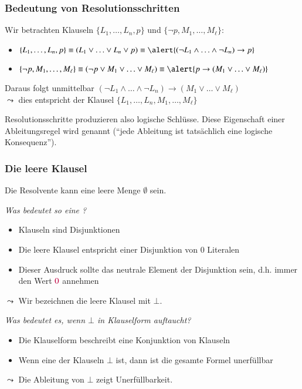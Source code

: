 \documentclass[onlymath]{beamer}
\begin{document}
\begin{frame}\frametitle{Bedeutung von Resolutionsschritten}

Wir betrachten Klauseln $\{L_1,\ldots,L_n,p\}$ und $\{\neg p,M_1,\ldots,M_\ell\}$:\pause
\begin{itemize}
\item $\{L_1,\ldots,L_n,p\}\equiv (L_1\vee\ldots\vee L_n\vee p) \equiv \alert{(\neg L_1\wedge\ldots\wedge\neg L_n)\to p}$\pause
\item $\{\neg p,M_1,\ldots,M_\ell\}\equiv (\neg p\vee M_1\vee\ldots\vee M_\ell)\equiv \alert{p\to (M_1\vee\ldots\vee M_\ell)}$\pause
\end{itemize}\medskip

Daraus folgt unmittelbar \alert{$(\neg L_1\wedge\ldots\wedge\neg L_n)\to (M_1\vee\ldots\vee M_\ell)$}\\
$\leadsto$ dies entspricht der Klausel $\{L_1,\ldots,L_n,M_1,\ldots,M_\ell\}$\pause
\bigskip


Resolutionsschritte produzieren also logische Schlüsse. Diese Eigenschaft einer Ableitungsregel wird  genannt ("`jede Ableitung ist tatsächlich eine logische Konsequenz"').


\end{frame}

\begin{frame}\frametitle{Die leere Klausel}

Die Resolvente kann eine leere Menge $\emptyset$ sein.\\[1ex]

\medskip

\emph{Was bedeutet so eine ?}\pause
\begin{itemize}
\item Klauseln sind Disjunktionen
\item Die leere Klausel entspricht einer Disjunktion von $0$ Literalen
\item Dieser Ausdruck sollte das neutrale Element der Disjunktion sein, d.h. immer den Wert $\textcolor{purple}{0}$ annehmen
\end{itemize}
$\leadsto$ Wir bezeichnen die leere Klausel mit $\bot$.
\bigskip\pause

\emph{Was bedeutet es, wenn $\bot$ in Klauselform auftaucht?}\pause
\begin{itemize}
\item Die Klauselform beschreibt eine Konjunktion von Klauseln
\item Wenn eine der Klauseln $\bot$ ist, dann ist die gesamte Formel unerfüllbar
\end{itemize}
$\leadsto$ Die Ableitung von $\bot$ zeigt Unerfüllbarkeit.

\end{frame}
\end{document}
